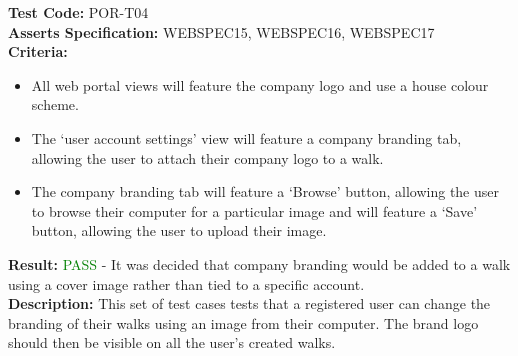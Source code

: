 \documentclass[11pt,a4paper]{report}
\begin{document}
\label{test:POR-T04}
\noindent\textbf{Test Code:} POR-T04\\
\textbf{Asserts Specification:} WEBSPEC15, WEBSPEC16, WEBSPEC17 \\ 
\textbf{Criteria:} \begin{itemize}
                     \item All web portal views will feature the company logo and use a house colour scheme.
                     \item The `user account settings' view will feature a company branding tab, allowing the user to attach their company logo to a walk.
                     \item The company branding tab will feature a `Browse' button, allowing the user to browse their computer for a particular image and will feature a `Save' button, allowing the user to upload their image.
                   \end{itemize}  
\textbf{Result:} \textcolor{green}{PASS} - It was decided that company branding would be added to a walk using a cover image rather than tied to a specific account.\\ 
\textbf{Description:} This set of test cases tests that a registered user can change the branding of their walks using an image from their computer. The brand logo should then be visible on all the user's created walks. \\
\end{document}
